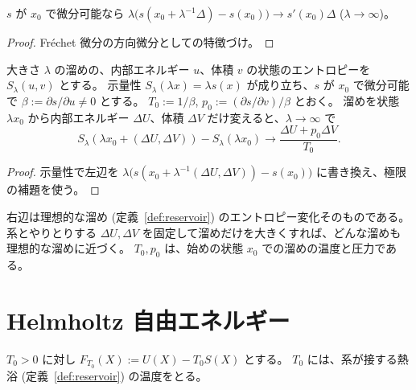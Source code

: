 \begin{lemma}[大きな溜めの極限]
  \label{lem:large-limit}
  \leanok
  $s$ が $x_0$ で微分可能なら $\lambda \bigl(s(x_0 + \lambda^{-1}\Delta) - s(x_0)\bigr) \to s'(x_0)\Delta$ ($\lambda \to \infty$)。
\end{lemma}

\begin{proof}
  \leanok
  Fréchet 微分の方向微分としての特徴づけ。
\end{proof}

\begin{theorem}[大きな溜めのエントロピー]
  \label{thm:large-reservoir}
  \leanok
  大きさ $\lambda$ の溜めの、内部エネルギー $u$、体積 $v$ の状態のエントロピーを $S_\lambda(u, v)$ とする。
  示量性 $S_\lambda(\lambda x) = \lambda s(x)$ が成り立ち、$s$ が $x_0$ で微分可能で $\beta := \partial s/\partial u \ne 0$ とする。
  $T_0 := 1/\beta$, $p_0 := (\partial s/\partial v)/\beta$ とおく。
  溜めを状態 $\lambda x_0$ から内部エネルギー $\Delta U$、体積 $\Delta V$ だけ変えると、$\lambda \to \infty$ で
  \[ S_\lambda(\lambda x_0 + (\Delta U, \Delta V)) - S_\lambda(\lambda x_0) \to \frac{\Delta U + p_0 \Delta V}{T_0}. \]
\end{theorem}

\begin{proof}
  \leanok
  示量性で左辺を $\lambda\bigl(s(x_0 + \lambda^{-1}(\Delta U, \Delta V)) - s(x_0)\bigr)$ に書き換え、極限の補題を使う。
\end{proof}

右辺は理想的な溜め (定義~\ref{def:reservoir}) のエントロピー変化そのものである。
系とやりとりする $\Delta U, \Delta V$ を固定して溜めだけを大きくすれば、どんな溜めも理想的な溜めに近づく。
$T_0, p_0$ は、始めの状態 $x_0$ での溜めの温度と圧力である。

\section{Helmholtz 自由エネルギー}

\begin{definition}[Helmholtz 関数]
  \label{def:helmholtz}
  \leanok
  $T_0 > 0$ に対し $F_{T_0}(X) := U(X) - T_0 S(X)$ とする。
  $T_0$ には、系が接する熱浴 (定義~\ref{def:reservoir}) の温度をとる。
\end{definition}

